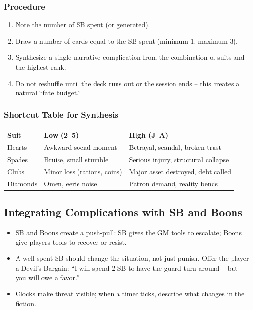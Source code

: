 \subsubsection{Procedure}
\begin{enumerate}
  \item Note the number of SB spent (or generated).
  \item Draw a number of cards equal to the SB spent (minimum 1, maximum 3).
  \item Synthesize a single narrative complication from the combination of suits and the highest rank.
  \item Do not reshuffle until the deck runs out or the session ends – this creates a natural ``fate budget.''
\end{enumerate}

\subsubsection{Shortcut Table for Synthesis}
\begin{tabular}{@{}ll@{}}
\toprule
\textbf{Suit} & \textbf{Low (2–5)} & \textbf{High (J–A)} \\
\midrule
Hearts   & Awkward social moment & Betrayal, scandal, broken trust \\
Spades   & Bruise, small stumble & Serious injury, structural collapse \\
Clubs    & Minor loss (rations, coins) & Major asset destroyed, debt called \\
Diamonds & Omen, eerie noise & Patron demand, reality bends \\
\bottomrule
\end{tabular}

\subsection{Integrating Complications with SB and Boons}

\begin{itemize}
  \item SB and Boons create a push-pull: SB gives the GM tools to escalate; Boons give players tools to recover or resist.
  \item A well-spent SB should change the situation, not just punish. Offer the player a Devil's Bargain: ``I will spend 2 SB to have the guard turn around – but you will owe a favor.''
  \item Clocks make threat visible; when a timer ticks, describe what changes in the fiction.
\end{itemize}

